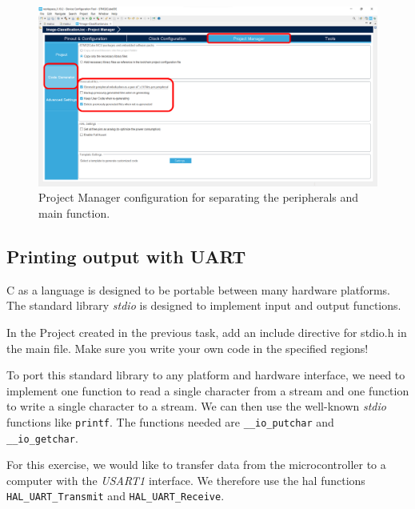 \documentclass[parskip=half,notes,cadrem,toolver]{iisvlsi}
\begin{document}
\begin{figure}[H]
    \begin{center}
        \includegraphics[width=\linewidth]{figures/proj_manager.png}
        \caption{Project Manager configuration for separating the peripherals and main function.}
        \label{fig:pm}
    \end{center}
\end{figure}



\subsection*{Printing output with UART}

C as a language is designed to be portable between many hardware platforms. The standard library \textit{stdio} is designed to implement input and output functions. 

\begin{studtask}
    In the Project created in the previous task, add an include directive for stdio.h in the main file. Make sure you write your own code in the specified regions!
\end{studtask}

To port this standard library to any platform and hardware interface, we need to implement one function to read a single character from a stream and one function to write a single character to a stream. We can then use the well-known \textit{stdio} functions like \texttt{printf}. The functions needed are \texttt{\_\_io\_putchar} and \texttt{\_\_io\_getchar}.

For this exercise, we would like to transfer data from the microcontroller to a computer with the \textit{USART1} interface. We therefore use the \gls{hal} functions \\ \texttt{HAL\_UART\_Transmit} and \texttt{HAL\_UART\_Receive}.
\end{document}
